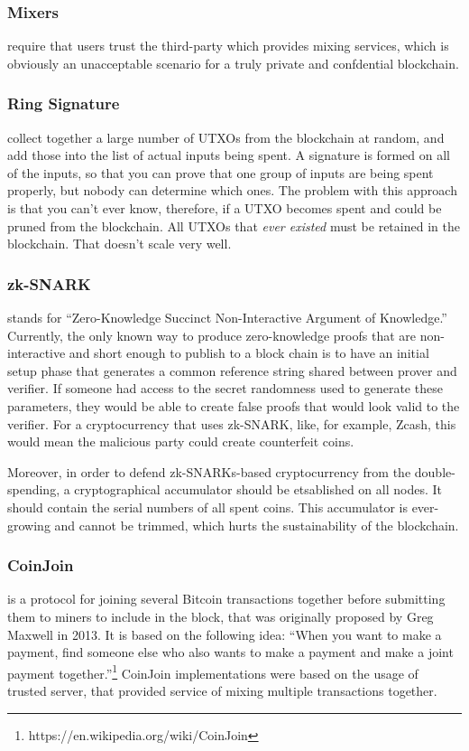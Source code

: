 \documentclass[a4paper, 10pt, conference]{ieeeconf}
\begin{document}
\subsubsection{Mixers} require that users trust the third-party which provides mixing services, which is obviously an unacceptable scenario for a truly private and confdential blockchain.

\subsubsection{Ring Signature} collect together a large number of UTXOs from the blockchain at random, and add those into the list of actual inputs being spent. A signature is formed on all of the inputs, so that you can prove that one group of inputs are being spent properly, but nobody can determine which ones. The problem with this approach is that you can't ever know, therefore, if a UTXO becomes spent and could be pruned from the blockchain. All UTXOs that \textit{ever existed} must be retained in the blockchain. That doesn't scale very well.

\subsubsection{zk-SNARK} stands for ``Zero-Knowledge Succinct Non-Interactive Argument of Knowledge.'' Currently, the only known way to produce zero-knowledge proofs that are non-interactive and short enough to publish to a block chain is to have an initial setup phase that generates a common reference string shared between prover and verifier. If someone had access to the secret randomness used to generate these parameters, they would be able to create false proofs that would look valid to the verifier. For a cryptocurrency that uses zk-SNARK, like, for example, Zcash, this would mean the malicious party could create counterfeit coins. 

Moreover, in order to defend zk-SNARKs-based cryptocurrency from the double-spending, a cryptographical accumulator should be etsablished on all nodes. It should contain the serial numbers of all spent coins. This accumulator is ever-growing and cannot be trimmed, which hurts the sustainability of the blockchain.

\subsubsection{CoinJoin} is a protocol for joining several Bitcoin transactions together before submitting them to miners to include in the block, that was originally proposed by Greg Maxwell in 2013. It is based on the following idea: ``When you want to make a payment, find someone else who also wants to make a payment and make a joint payment together.''\footnote{https://en.wikipedia.org/wiki/CoinJoin} CoinJoin implementations were based on the usage of trusted server, that provided service of mixing multiple transactions together.
\end{document}
